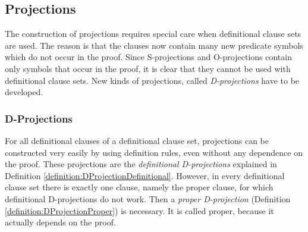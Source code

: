 \documentclass{llncs}
\begin{document}
\subsection{Projections}

The construction of projections requires special care when definitional clause sets are used. The reason is that the clauses now contain many new predicate symbols which do not occur in the proof. Since S-projections and O-projections contain only symbols that occur in the proof, it is clear that they cannot be used with definitional clause sets. New kinds of projections, called \emph{D-projections} have to be developed.


\subsubsection{D-Projections}

For all definitional clauses of a definitional clause set, projections can be constructed very easily by using definition rules, even without any dependence on the proof. These projections are the \emph{definitional D-projections} explained in Definition \ref{definition:DProjectionDefinitional}. However, in every definitional clause set there is exactly one clause, namely the proper clause, for which definitional D-projections do not work. Then a \emph{proper D-projection} (Definition \ref{definition:DProjectionProper}) is necessary. It is called proper, because it actually depends on the proof.
\end{document}
